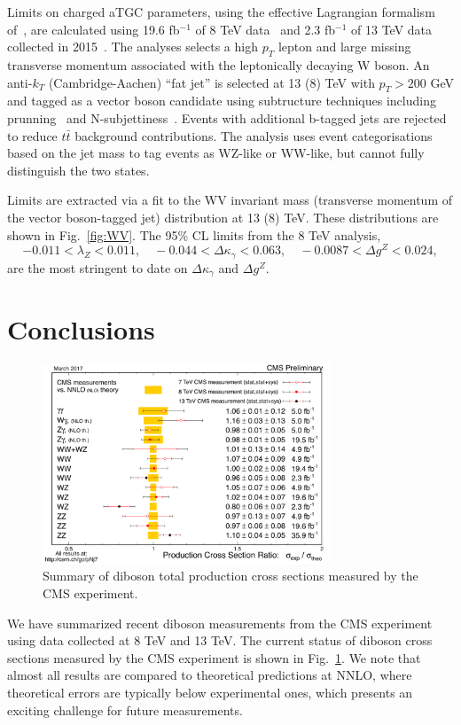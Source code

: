 \documentclass[10pt]{article}
\begin{document}
Limits on charged aTGC parameters, using the effective Lagrangian formalism 
of~\cite{Hagiwara:1993ck}, are calculated using 19.6 fb$^{-1}$ of 8 TeV 
data~\cite{CMS:2017ruh}
and 2.3 fb$^{-1}$ of 13 TeV data collected in 2015~\cite{Sirunyan:2017bey}.
The analyses selects a high $p_{T}$ lepton and large missing transverse momentum
associated with the leptonically decaying W boson. An anti-$k_{T}$
(Cambridge-Aachen) ``fat jet''  is selected at 13 (8) TeV with $p_{T} > 200$ GeV 
and tagged as a vector boson candidate using
subtructure techniques including prunning~\cite{Ellis:2009me} and 
N-subjettiness~\cite{Thaler:2010tr}. 
Events with additional b-tagged jets are 
rejected to reduce $t\bar{t}$ background contributions. The analysis uses event categorisations
based on the jet mass to tag events as WZ-like or WW-like, but cannot fully 
distinguish the two states.

Limits are extracted via a fit to the WV invariant mass (transverse momentum of the vector boson-tagged jet) 
distribution at 13 (8) TeV.
These distributions are shown in Fig.~\ref{fig:WV}.
The 95\% CL limits from the 8 TeV analysis,
\begin{equation}
  -0.011 < \lambda_{Z} < 0.011, \quad -0.044 < \Delta\kappa_{\gamma} < 0.063, \quad -0.0087 < \Delta g^{Z} < 0.024,
\end{equation}
are the most stringent to date on $\Delta\kappa_\gamma$ and $\Delta g^{Z}$.

\section{Conclusions}
\begin{figure}[htb]
  \centering
    \includegraphics[height=2.35in]{figures/CrossSectionSummary.pdf}
  \caption{ Summary of diboson total production cross sections measured by the CMS experiment. }
  \label{fig:xsecs}
\end{figure}


We have summarized recent diboson measurements from the CMS experiment using
data collected at 8 TeV and 13 TeV. The current status of diboson cross sections 
measured by the CMS experiment is shown in Fig.~\ref{fig:xsecs}. We note that 
almost all results are compared to theoretical predictions at NNLO, where theoretical 
errors are typically below experimental ones, which 
presents an exciting challenge
for future measurements. 



\end{document}
